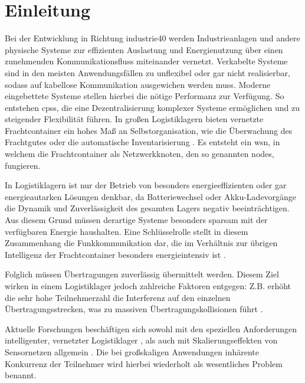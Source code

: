 \chapter{Einleitung}\label{kap:eileitung}

Bei der Entwicklung in Richtung \gls{industrie40} werden Industrieanlagen und andere physische Systeme zur effizienten Auslastung und Energienutzung über einen zunehmenden Kommunikationsfluss miteinander vernetzt. Verkabelte Systeme sind in den meisten Anwendungsfällen zu unflexibel oder gar nicht realisierbar, sodass auf kabellose Kommunikation ausgewichen werden muss. Moderne eingebettete Systeme stellen hierbei die nötige Performanz zur Verfügung. So entstehen \acfp{cps}, die eine Dezentralisierung komplexer Systeme ermöglichen und zu steigender Flexibilität führen. In großen Logistiklagern bieten vernetzte Frachtcontainer ein hohes Maß an Selbstorganisation, wie die Überwachung des Frachtgutes oder die automatische Inventarisierung \citep{inBin}. Es entsteht ein \acf{wsn}, in welchem die Frachtcontainer als Netzwerkknoten, den so genannten \glspl{node}, fungieren.

In Logistiklagern ist nur der Betrieb von besonders energieeffizienten oder gar energieautarken Lösungen denkbar, da Batteriewechsel oder Akku-Ladevorgänge die Dynamik und Zuverlässigkeit des gesamten Lagers negativ beeinträchtigen. Aus diesem Grund müssen derartige Systeme besonders sparsam mit der verfügbaren Energie haushalten. Eine Schlüsselrolle stellt in diesem Zusammenhang die Funkkommunikation dar, die im Verhältnis zur übrigen Intelligenz der Frachtcontainer besonders energieintensiv ist \citep{inBin}\citep{inBinTestbed}\citep{xmac}.

Folglich müssen Übertragungen zuverlässig übermittelt werden. Diesem Ziel wirken in einem Logistiklager jedoch zahlreiche Faktoren entgegen: Z.B. erhöht die sehr hohe Teilnehmerzahl die Interferenz auf den einzelnen Übertragungsstrecken, was zu massiven Übertragungskollisionen führt \citep{inBinTestbed}\citep{GreenOrbs}.

Aktuelle Forschungen beschäftigen sich sowohl mit den speziellen Anforderungen intelligenter, vernetzter Logistiklager \citep{inBinTestbed}, als auch mit Skalierungseffekten von Sensornetzen allgemein \citep{GreenOrbs}. Die bei  großskaligen Anwendungen  inhärente Konkurrenz der Teilnehmer wird hierbei wiederholt als wesentliches Problem benannt.

